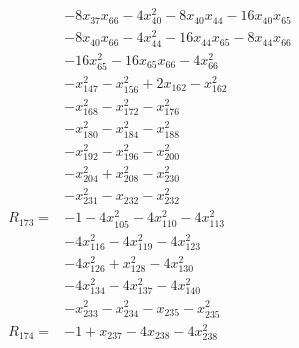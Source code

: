 \begin{align*}
&-8x_{37}x_{66} -4x_{40}^{2} -8x_{40}x_{44} -16x_{40}x_{65}\\
&-8x_{40}x_{66} -4x_{44}^{2} -16x_{44}x_{65} -8x_{44}x_{66}\\
&-16x_{65}^{2} -16x_{65}x_{66} -4x_{66}^{2}\\
&-x_{147}^{2} -x_{156}^{2} +2x_{162} -x_{162}^{2}\\
&-x_{168}^{2} -x_{172}^{2} -x_{176}^{2}\\
&-x_{180}^{2} -x_{184}^{2} -x_{188}^{2}\\
&-x_{192}^{2} -x_{196}^{2} -x_{200}^{2}\\
&-x_{204}^{2} +x_{208}^{2} -x_{230}^{2}\\
&-x_{231}^{2} -x_{232} -x_{232}^{2}\\[3pt]
R_{173}={}&-1 -4x_{105}^{2} -4x_{110}^{2} -4x_{113}^{2}\\
&-4x_{116}^{2} -4x_{119}^{2} -4x_{123}^{2}\\
&-4x_{126}^{2} +x_{128}^{2} -4x_{130}^{2}\\
&-4x_{134}^{2} -4x_{137}^{2} -4x_{140}^{2}\\
&-x_{233}^{2} -x_{234}^{2} -x_{235} -x_{235}^{2}\\[3pt]
R_{174}={}&-1 +x_{237} -4x_{238} -4x_{238}^{2}\\[3pt]
\end{align*}
